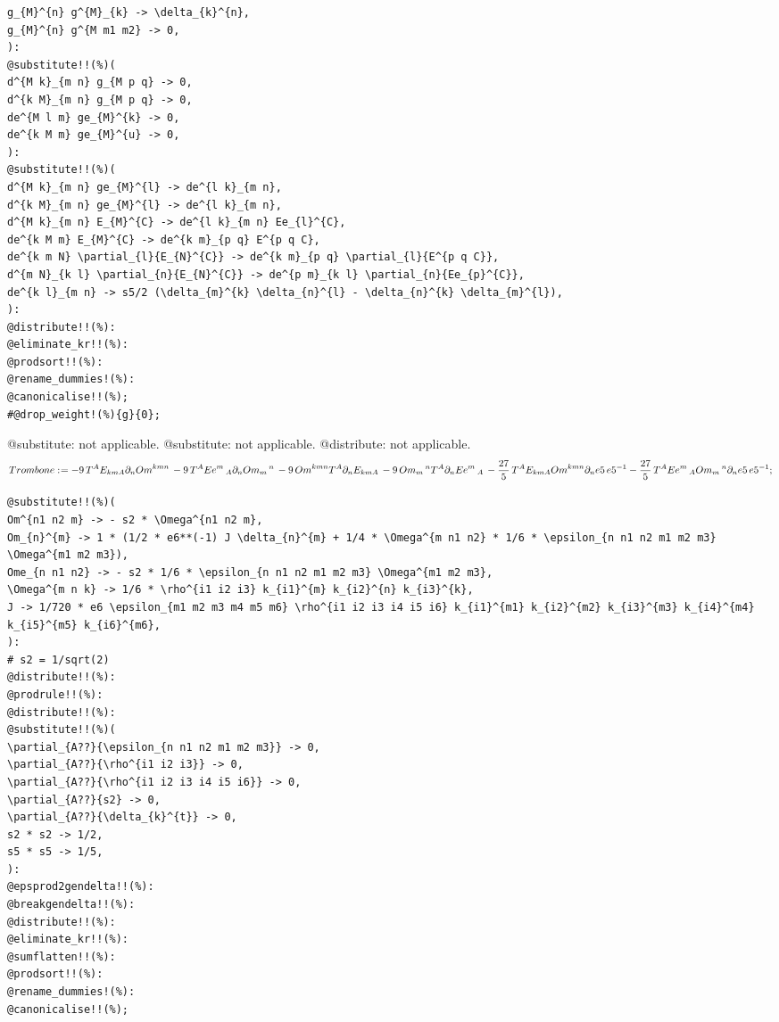 \documentclass[11pt]{article}
\def\specialcolon{\mathrel{\mathop{:}}\hspace{-.5em}}
\begin{document}
{\begin{verbatim}
g_{M}^{n} g^{M}_{k} -> \delta_{k}^{n},
g_{M}^{n} g^{M m1 m2} -> 0,
):
@substitute!!(%)(
d^{M k}_{m n} g_{M p q} -> 0,
d^{k M}_{m n} g_{M p q} -> 0,
de^{M l m} ge_{M}^{k} -> 0,
de^{k M m} ge_{M}^{u} -> 0,
):
@substitute!!(%)(
d^{M k}_{m n} ge_{M}^{l} -> de^{l k}_{m n},
d^{k M}_{m n} ge_{M}^{l} -> de^{l k}_{m n},
d^{M k}_{m n} E_{M}^{C} -> de^{l k}_{m n} Ee_{l}^{C},
de^{k M m} E_{M}^{C} -> de^{k m}_{p q} E^{p q C},
de^{k m N} \partial_{l}{E_{N}^{C}} -> de^{k m}_{p q} \partial_{l}{E^{p q C}},
d^{m N}_{k l} \partial_{n}{E_{N}^{C}} -> de^{p m}_{k l} \partial_{n}{Ee_{p}^{C}},
de^{k l}_{m n} -> s5/2 (\delta_{m}^{k} \delta_{n}^{l} - \delta_{n}^{k} \delta_{m}^{l}),
):
@distribute!!(%):
@eliminate_kr!!(%):
@prodsort!!(%):
@rename_dummies!(%):
@canonicalise!!(%);
#@drop_weight!(%){g}{0};
\end{verbatim}}
@substitute: not applicable.
@substitute: not applicable.
@distribute: not applicable.
\begin{dmath*}[compact, spread=2pt]
Trombone\specialcolon{}=  - 9\, {T}^{A} {E}_{k m A} {\partial}_{n}{{Om}^{k m n}}\,  - 9\, {T}^{A} {Ee}^{m}\,_{A} {\partial}_{n}{{Om}_{m}\,^{n}}\,  - 9\, {Om}^{k m n} {T}^{A} {\partial}_{n}{{E}_{k m A}}\,  - 9\, {Om}_{m}\,^{n} {T}^{A} {\partial}_{n}{{Ee}^{m}\,_{A}}\,  - \frac{27}{5}\, {T}^{A} {E}_{k m A} {Om}^{k m n} {\partial}_{n}{e5}\,  e5{}^{-1} - \frac{27}{5}\, {T}^{A} {Ee}^{m}\,_{A} {Om}_{m}\,^{n} {\partial}_{n}{e5}\,  e5{}^{-1};
\end{dmath*}
{\color[named]{Blue}\begin{verbatim}
@substitute!!(%)(
Om^{n1 n2 m} -> - s2 * \Omega^{n1 n2 m},
Om_{n}^{m} -> 1 * (1/2 * e6**(-1) J \delta_{n}^{m} + 1/4 * \Omega^{m n1 n2} * 1/6 * \epsilon_{n n1 n2 m1 m2 m3} \Omega^{m1 m2 m3}),
Ome_{n n1 n2} -> - s2 * 1/6 * \epsilon_{n n1 n2 m1 m2 m3} \Omega^{m1 m2 m3},
\Omega^{m n k} -> 1/6 * \rho^{i1 i2 i3} k_{i1}^{m} k_{i2}^{n} k_{i3}^{k},
J -> 1/720 * e6 \epsilon_{m1 m2 m3 m4 m5 m6} \rho^{i1 i2 i3 i4 i5 i6} k_{i1}^{m1} k_{i2}^{m2} k_{i3}^{m3} k_{i4}^{m4} k_{i5}^{m5} k_{i6}^{m6},
):
# s2 = 1/sqrt(2)
@distribute!!(%):
@prodrule!!(%):
@distribute!!(%):
@substitute!!(%)(
\partial_{A??}{\epsilon_{n n1 n2 m1 m2 m3}} -> 0,
\partial_{A??}{\rho^{i1 i2 i3}} -> 0,
\partial_{A??}{\rho^{i1 i2 i3 i4 i5 i6}} -> 0,
\partial_{A??}{s2} -> 0,
\partial_{A??}{\delta_{k}^{t}} -> 0,
s2 * s2 -> 1/2,
s5 * s5 -> 1/5,
):
@epsprod2gendelta!!(%):
@breakgendelta!!(%):
@distribute!!(%):
@eliminate_kr!!(%):
@sumflatten!!(%):
@prodsort!!(%):
@rename_dummies!(%):
@canonicalise!!(%);
\end{verbatim}}
\end{document}
